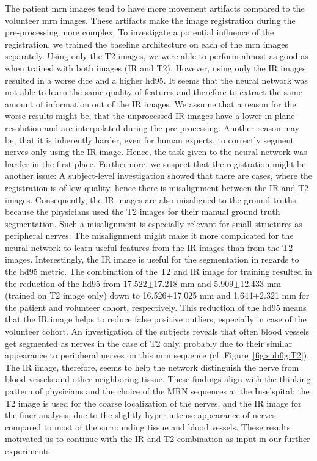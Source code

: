 The patient \gls{mrn} images tend to have more movement artifacts compared to the volunteer \gls{mrn} images. These artifacts make the image registration during the pre-processing more complex. To investigate a potential influence of the registration, we trained the baseline architecture on each of the \gls{mrn} images separately. Using only the T2 images, we were able to perform almost as good as when trained with both images (IR and T2). However, using only the IR images resulted in a worse \acrlong{dice} and a higher \acrlong{hd95}. It seems that the neural network was not able to learn the same quality of features and therefore to extract the same amount of information out of the IR images. We assume that a reason for the worse results might be, that the unprocessed IR images have a lower in-plane resolution and are interpolated during the pre-processing. Another reason may be, that it is inherently harder, even for human experts, to correctly segment nerves only using the IR image. Hence, the task given to the neural network was harder in the first place. Furthermore, we suspect that the registration might be another issue: A subject-level investigation showed that there are cases, where the registration is of low quality, hence there is misalignment between the IR and T2 images. Consequently, the IR images are also misaligned to the ground truths because the physicians used the T2 images for their manual ground truth segmentation. Such a misalignment is especially relevant for small structures as peripheral nerves. The misalignment might make it more complicated for the neural network to learn useful features from the IR images than from the T2 images. Interestingly, the IR image is useful for the segmentation in regards to the \gls{hd95} metric. The combination of the T2 and IR image for training resulted in the reduction of the \acrlong{hd95} from 17.522$\pm$17.218 mm and 5.909$\pm$12.433 mm (trained on T2 image only) down to 16.526$\pm$17.025 mm and 1.644$\pm$2.321 mm for the patient and volunteer cohort, respectively. This reduction of the \gls{hd95} means that the IR image helps to reduce false positive outliers, especially in case of the volunteer cohort. An investigation of the subjects reveals that often blood vessels get segmented as nerves in the case of T2 only, probably due to their similar appearance to peripheral nerves on this \gls{mrn} sequence (cf. Figure~\ref{fig:subfig:T2}). The IR image, therefore, seems to help the network distinguish the nerve from blood vessels and other neighboring tissue. These findings align with the thinking pattern of physicians and the choice of the MRN sequences at the Inselspital: the T2 image is used for the coarse localization of the nerves, and the IR image for the finer analysis, due to the slightly hyper-intense appearance of nerves compared to most of the surrounding tissue and blood vessels. These results motivated us to continue with the IR and T2 combination as input in our further experiments.

